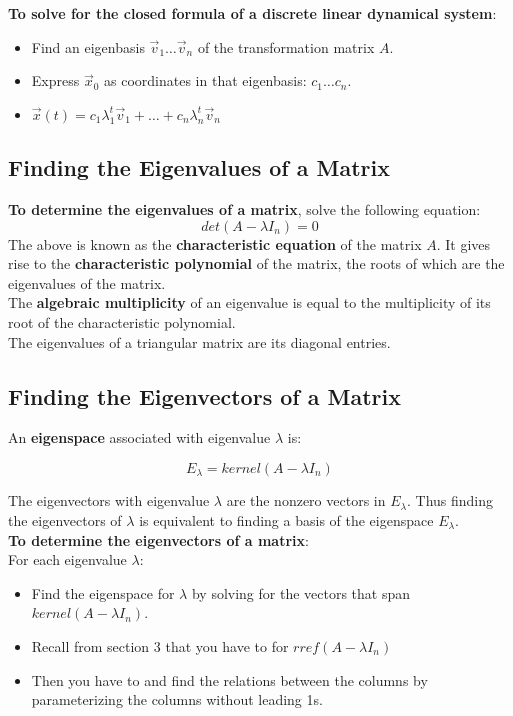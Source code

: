 \documentclass[]{scrartcl}
\begin{document}
	\textbf{To solve for the closed formula of a discrete linear dynamical system}:
	\begin{itemize}
		\item Find an eigenbasis $\vec{v}_1 \ldots \vec{v}_n$ of the transformation matrix $A$.
		\item Express $\vec{x}_0$ as coordinates in that eigenbasis: $c_1 \ldots c_n$.
		\item $\vec{x}(t) = c_1 \lambda_1^t \vec{v}_1 + \ldots + c_n \lambda_n^t \vec{v}_n$
	\end{itemize}
	
	\subsection{Finding the Eigenvalues of a Matrix}
	
	\textbf{To determine the eigenvalues of a matrix}, solve the following equation:
	$$ det(A - \lambda I_n) = 0 $$
	The above is known as the \textbf{characteristic equation} of the matrix $A$. It gives rise to the \textbf{characteristic polynomial} of the matrix, the roots of which are the eigenvalues of the matrix.\\
	
	The \textbf{algebraic multiplicity} of an eigenvalue is equal to the multiplicity of its root of the characteristic polynomial.\\
	
	The eigenvalues of a triangular matrix are its diagonal entries.\\
	
	\subsection{Finding the Eigenvectors of a Matrix}
	An \textbf{eigenspace} associated with eigenvalue $\lambda$ is:
	
	$$
	E_\lambda = kernel(A - \lambda I_n)
	$$
	
	The eigenvectors with eigenvalue $\lambda$ are the nonzero vectors in $E_\lambda$. Thus finding the eigenvectors of $\lambda$ is equivalent to finding a basis of the eigenspace $E_\lambda$.\\
	
	\textbf{To determine the eigenvectors of a matrix}:\\
	For each eigenvalue $\lambda$:
	\begin{itemize}
		\item Find the eigenspace for $\lambda$ by solving for the vectors that span $kernel(A - \lambda I_n)$.
		\item Recall from section 3 that you have to for $rref(A-\lambda I_n)$
		\item Then you have to and find the relations between the columns by parameterizing the columns without leading 1s.
	\end{itemize}
\end{document}
